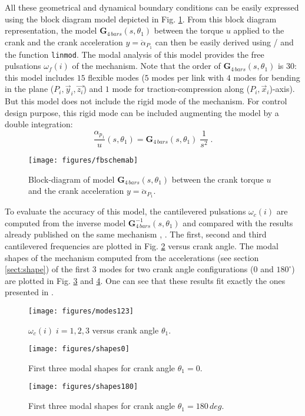 All these geometrical and dynamical boundary conditions can be easily expressed using the block diagram model depicted in Fig. \ref{fig:4bsch}. From this block diagram representation, the model  $\mathbf{G}_{4\,bars}(s,\theta_1)$ between the torque $u$ applied to the crank and the crank acceleration $y=\ddot{\alpha}_{P_1}$ can then be easily derived using \matlab/ \simulink and the function \verb|linmod|. The modal analysis of this model provides the free pulsations $\omega_f(i)$ of the mechanism. Note that the order of $\mathbf{G}_{4\,bars}(s,\theta_1)$ is $30$: this model includes $15$ flexible modes ($5$ modes per link with $4$ modes for bending in the plane ($P_i,\vec{y}_i,\vec{z_i}$) and $1$ mode for traction-compression along ($P_i,\vec{x}_i$)-axis). But this model does not include the rigid mode  of the mechanism. For control design purpose, this rigid mode can be included augmenting the model by a double integration:
\[
\frac{\alpha_{p_1}}{u}(s,\theta_1)=\mathbf{G}_{4\,bars}(s,\theta_1)\;\frac{1}{s^2}\;.
\]

\begin{figure}[htbp!]
  \texttt{[image: figures/fbschemab]}
\caption{Block-diagram of model $\mathbf{G}_{4\,bars}(s,\theta_1)$ between the crank torque $u$ and the crank acceleration $y=\ddot{\alpha}_{P_1}$.}
\label{fig:4bsch} 
\end{figure}

To evaluate the accuracy of this model, the cantilevered pulsations $\omega_c(i)$ are computed from the inverse model $\mathbf{G}_{4\,bars}^{-1}(s,\theta_1)$ and compared with the results already published on the same mechanism \cite{Kitis1990267}, \cite{Turcic1984}. The first, second and third cantilevered frequencies are plotted in Fig. \ref{fig:modes123} versus crank angle. The modal shapes of the mechanism computed from the accelerations (see section \ref{sect:shape}) of the first 3 modes for two crank angle configurations ($0$ and $180^{\circ}$) are plotted in Fig. \ref{fig:shapes0} and \ref{fig:shapes180}. One can see that these results fit exactly the ones presented in \cite{Kitis1990267}.
\begin{figure}[htbp!]
  \texttt{[image: figures/modes123]}
\caption{$\omega_{c}(i)\;i=1,2,3$ versus crank angle $\theta_1$.}
\label{fig:modes123} 
\end{figure}
\begin{figure}[htbp!]
  \texttt{[image: figures/shapes0]}
\caption{First three modal shapes for crank angle $\theta_1=0$.}
\label{fig:shapes0} 
\end{figure}
\begin{figure}[htbp!]
  \texttt{[image: figures/shapes180]}
\caption{First three modal shapes for crank angle $\theta_1=180\,deg$.}
\label{fig:shapes180} 
\end{figure}

